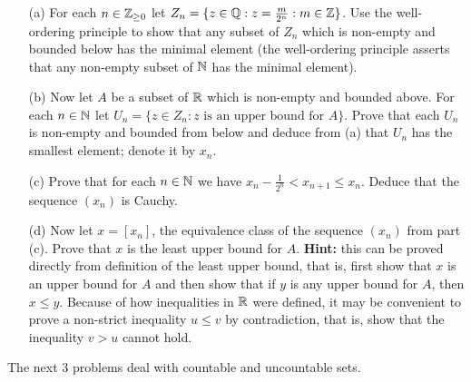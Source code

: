 \documentclass[11pt]{amsart}
\begin{document}
\begin{itemize}
\item[(a)] For each $n\in{\mathbb Z}_{\geq 0}$ let $Z_n=\{z\in{\mathbb Q}: z=\frac{m}{2^n}: m\in{\mathbb Z}\}$. Use the well-ordering principle to show that any
subset of $Z_n$ which is non-empty and bounded below has the minimal element (the well-ordering principle asserts that any non-empty subset of
${\mathbb N}$ has the minimal element).
\item[(b)] Now let $A$ be a subset of ${\mathbb R}$ which is non-empty and bounded above. For each $n\in{\mathbb N}$ let
$U_n=\{z\in Z_n: z\mbox{ is an upper bound for }A\}$. Prove that each $U_n$ is non-empty and bounded from below and deduce from (a)
that $U_n$ has the smallest element; denote it by $x_n$.
\item[(c)] Prove that for each $n\in{\mathbb N}$ we have $x_n-\frac{1}{2^n}<x_{n+1}\leq x_n$. Deduce that the sequence $(x_n)$ is Cauchy.
\item[(d)] Now let $x=[x_n]$, the equivalence class of the sequence $(x_n)$ from part (c). Prove that $x$ is the least upper bound for $A$.
{\bf Hint:} this can be proved directly from definition of the least upper bound, that is, first show that $x$ is an upper bound for $A$
and then show that if $y$ is any upper bound for $A$, then $x\leq y$. Because of how inequalities in ${\mathbb R}$ were defined, it may
be convenient to prove a non-strict inequality $u\leq v$ by contradiction, that is, show that the inequality $v>u$ cannot hold.
\end{itemize}
\skv
The next 3 problems deal with countable and uncountable sets.
\end{document}
